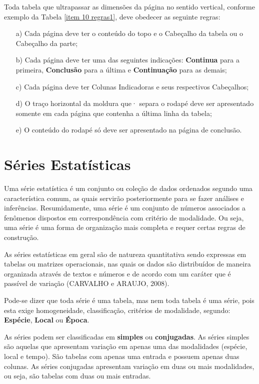 Toda tabela que ultrapassar as dimensões da página no sentido vertical, conforme exemplo da Tabela \ref{item 10 regras1}, deve obedecer as seguinte regras:

\begin{itemize}
\item [a)] Cada página deve ter o conteúdo do topo e o
Cabeçalho da tabela ou o Cabeçalho da parte;
\item [b)] Cada página deve ter uma das seguintes indicações:
\textbf{Continua} para a primeira, \textbf{Conclusão} para a última e \textbf{Continuação} para as demais;
\item [c)] Cada página deve ter Colunas Indicadoras e seus
respectivos Cabeçalhos;
\item [d)] O traço horizontal da moldura que· separa o rodapé deve ser apresentado somente em cada página que contenha a última linha da tabela;
\item [e)] O conteúdo do rodapé só deve ser apresentado na página de conclusão.
\end{itemize}





\section{Séries Estatísticas}

\inic Uma série estatística é um conjunto ou coleção de dados ordenados segundo uma característica comum, as quais servirão posteriormente para se fazer análises e inferências. Resumidamente, uma série é um conjunto de números associados a fenômenos dispostos em correspondência com critério de modalidade. Ou seja, uma série é uma forma de organização mais completa e requer certas regras de construção.\vskip0.3cm


\inic As séries estatísticas em geral são de natureza quantitativa sendo expressas em tabelas ou matrizes operacionais, nas quais os dados são distribuídos de maneira organizada através de textos e números e de acordo com um caráter que é passível de variação (CARVALHO e ARAUJO, 2008).\vskip0.3cm

Pode-se dizer que toda série é uma tabela, mas nem toda tabela é
uma série, pois esta exige homogeneidade, classificação, critérios
de modalidade, segundo: \textbf{Espécie}, \textbf{Local} ou
\textbf{Época}. \vskip0.3cm

As séries podem ser classificadas em \textbf{simples} ou \textbf{conjugadas}. As séries simples são aquelas que apresentam variação em apenas uma das modalidades (espécie, local e tempo). São tabelas com apenas uma entrada e possuem apenas duas colunas. As séries conjugadas apresentam variação em duas ou mais modalidades, ou seja, são tabelas com duas ou mais entradas.\vskip0.3cm

